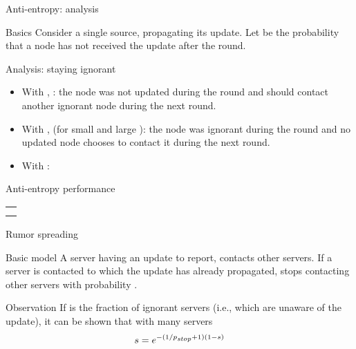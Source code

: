   \begin{slide}{Anti-entropy: analysis}
    \begin{block}{Basics}
      Consider a single source, propagating its update. Let  be the probability that a node has
      not received the update after the  round.
    \end{block}
    \begin{block}{Analysis: staying ignorant}
      \begin{itemize}\firmlist
      \item With , : the node was not updated during the
         round and should contact another ignorant node during the
        next round.
      \item With ,  (for
        small  and large ): the node was ignorant during the
         round and no updated node chooses to contact it during
        the next round.
      \item With : 
      \end{itemize}
    \end{block}
  \end{slide}
  \begin{slide}{Anti-entropy performance}
    \begin{centerfig}
      \begin{tabular}{c}
        [0.71]{04-35a} \\
        [0.71]{04-35b} 
      \end{tabular}
    \end{centerfig}
  \end{slide}
\begin{slide}{Rumor spreading}
  \newcommand{\pstop}{p_{\mbox{\scriptsize\itshape stop}}}
  \begin{block}{Basic model} 
    A server  having an update to report, contacts other servers. If a server is contacted to which the
    update has already propagated,  stops contacting other servers with probability \mathexpr{\pstop}.
  \end{block}
  \begin{block}{Observation}
    If  is the fraction of ignorant servers (i.e., which are unaware of the update), it can be
    shown that with many servers
    \[ s = e^{-(1/{\pstop} + 1)(1 - s)}\]
  \end{block}
\end{slide}
